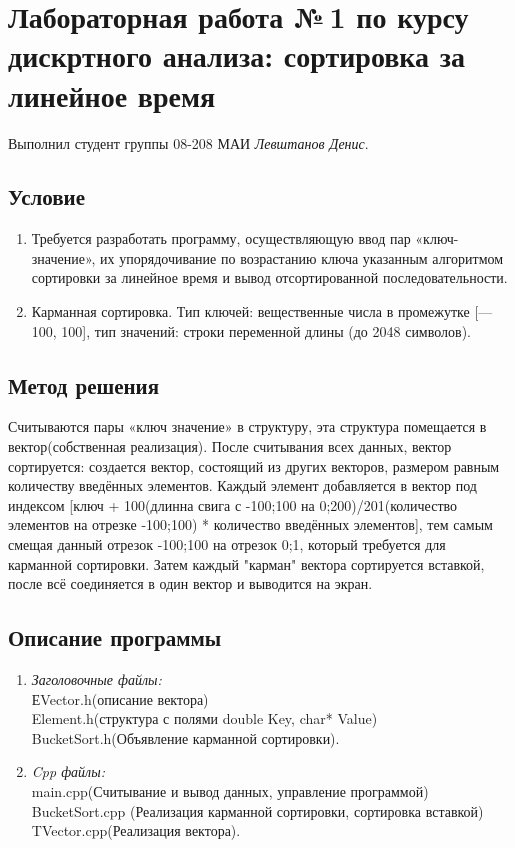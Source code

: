 \documentclass[12pt]{article}
\begin{document}
\section*{Лабораторная работа №\,1 по курсу дискртного анализа: сортировка за линейное время}

Выполнил студент группы 08-208 МАИ \textit{Левштанов Денис}.

\subsection*{Условие}

\begin{enumerate}
\item Требуется разработать программу, осуществляющую ввод пар «ключ-значение», их упорядочивание по возрастанию ключа указанным алгоритмом сортировки за линейное время и вывод отсортированной последовательности.
\item Карманная сортировка. Тип ключей: вещественные числа в промежутке [—100, 100], тип значений: строки переменной длины (до 2048 символов).
\end{enumerate}

\subsection*{Метод решения}

Считываются  пары «ключ значение» в структуру, эта структура помещается в вектор(собственная реализация). После считывания всех данных, вектор сортируется: создается вектор, состоящий из других векторов, размером равным количеству введённых элементов. Каждый элемент добавляется в вектор под индексом [ключ + 100(длинна свига с -100;100 на 0;200)/201(количество элементов на отрезке -100;100)  * количество введённых элементов], тем самым смещая данный отрезок -100;100 на отрезок 0;1, который требуется для карманной сортировки. Затем каждый "карман" вектора сортируется вставкой, после всё соединяется в один вектор и выводится на экран.

\subsection*{Описание программы}

\begin{enumerate}
\item\textsl{Заголовочные файлы:}\\ ЕVector.h(описание вектора) \\Element.h(структура с полями double Key, char* Value)\\ BucketSort.h(Объявление карманной сортировки).\\
\item\textsl{Cpp файлы:}\\ main.cpp(Считывание и вывод данных, управление программой)\\ BucketSort.cpp (Реализация карманной сортировки, сортировка вставкой)\\ TVector.cpp(Реализация вектора).
\end{enumerate}
\end{document}
